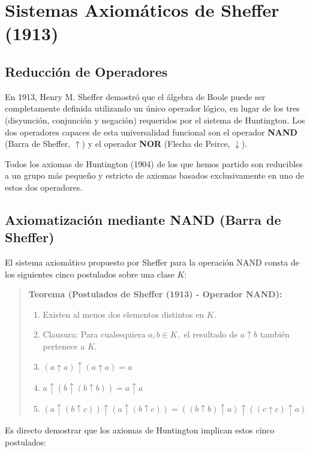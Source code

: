 \chapter{Sistemas Axiomáticos de Sheffer (1913)}

\section{Reducción de Operadores}

En 1913, Henry M. Sheffer demostró que el álgebra de Boole puede ser completamente definida utilizando un único operador lógico, en lugar de los tres (disyunción, conjunción y negación) requeridos por el sistema de Huntington. Los dos operadores capaces de esta universalidad funcional son el operador \textbf{NAND} (Barra de Sheffer, $\uparrow$) y el operador \textbf{NOR} (Flecha de Peirce, $\downarrow$). 

Todos los axiomas de Huntington (1904) de los que hemos partido son reducibles a un grupo más pequeño y estricto de axiomas basados exclusivamente en uno de estos dos operadores.

\section{Axiomatización mediante NAND (Barra de Sheffer)}

El sistema axiomático propuesto por Sheffer para la operación NAND consta de los siguientes cinco postulados sobre una clase $K:$

\begin{quote}\textbf{Teorema (Postulados de Sheffer (1913) - Operador NAND):}\label{sheffer_nand}
\begin{enumerate}
    \item Existen al menos dos elementos distintos en $K.$
    \item Clausura: Para cualesquiera $a, b \in K,$ el resultado de $a \uparrow b$ también pertenece a $K.$
    \item $(a \uparrow a) \uparrow (a \uparrow a) = a$
    \item $a \uparrow (b \uparrow (b \uparrow b)) = a \uparrow a$
    \item $(a \uparrow (b \uparrow c)) \uparrow (a \uparrow (b \uparrow c)) = ((b \uparrow b) \uparrow a) \uparrow ((c \uparrow c) \uparrow a)$
\end{enumerate}
\end{quote}

Es directo demostrar que los axiomas de Huntington implican estos cinco postulados:

